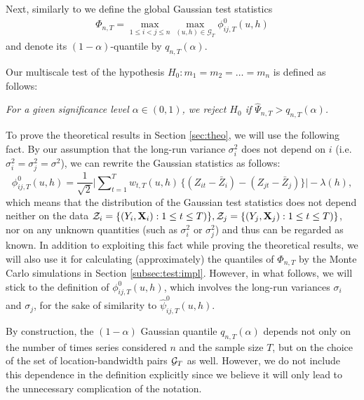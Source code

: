 \documentclass[a4paper,12pt]{article}
\makeatletter
\renewcommand{\eqref}[1]{\tagform@{\ref{#1}}}
\makeatother
\begin{document}
Next, similarly to \eqref{eq:Psi_hat} we define the global Gaussian test statistics
\begin{align}\label{eq:Phi}
\Phi_{n,T} = \max_{1 \le i < j \le n}\max_{(u,h) \in \mathcal{G}_T} \phi^0_{ij,T}(u, h)
\end{align}
and denote its $(1-\alpha)$-quantile by $q_{n,T}(\alpha)$.

Our multiscale test of the hypothesis $H_0: m_1 = m_2 = \ldots = m_n$ is defined as follows: 
\begin{center}
\begin{minipage}[c][1.25cm][c]{13cm}
\textit{For a given significance level $\alpha \in (0,1)$, we reject $H_0$ if $\widehat{\Psi}_{n,T} > q_{n,T}(\alpha)$.}
\end{minipage}
\end{center}

\begin{remark}
To prove the theoretical results in Section \ref{sec:theo}, we will use the following fact. By our assumption that the long-run variance $\sigma_i^2$ does not depend on $i$ \linebreak (i.e. $\sigma_i^2 = \sigma^2_j = \sigma^2$), we can rewrite the Gaussian statistics \eqref{eq:phi_zero_ij} as follows:
\[\phi^0_{ij,T}(u, h) = \frac{1}{\sqrt{2}} \Big|\sum\nolimits_{t=1}^T w_{t,T}(u,h) \, \big\{ (Z_{it} - \bar{Z}_i) - (Z_{jt} - \bar{Z}_j) \big\}\Big| - \lambda(h), \] 
which means that the distribution of the Gaussian test statistics does not depend neither on the data $\mathcal{Z}_i =\{ (Y_i, \mathbf{X}_i) : 1\leq t \leq T)\}, \mathcal{Z}_j =\{ (Y_j, \mathbf{X}_j) : 1\leq t \leq T)\}$, nor on any unknown quantities (such as $\sigma^2_i$ or $\sigma_j^2$) and thus can be regarded as known. In addition to exploiting this fact while proving the theoretical results, we will also use it for calculating (approximately) the quantiles of $\Phi_{n, T}$ by the Monte Carlo simulations in Section \ref{subsec:test:impl}. However, in what follows, we will stick to the definition \eqref{eq:phi_zero_ij} of $\phi^0_{ij,T}(u, h)$, which involves the long-run variances $\sigma_i$ and $\sigma_j$, for the sake of similarity to $\hat{\psi}^0_{ij,T}(u, h)$.
\end{remark}

\begin{remark}
By construction, the $(1-\alpha)$ Gaussian quantile $q_{n, T}(\alpha)$ depends not only on the number of times series considered $n$ and the sample size $T$, but on the choice of the set of location-bandwidth pairs $\mathcal{G}_T$ as well. However, we do not include this dependence in the definition explicitly since we believe it will only lead to the unnecessary complication of the notation. 
\end{remark}
\end{document}

